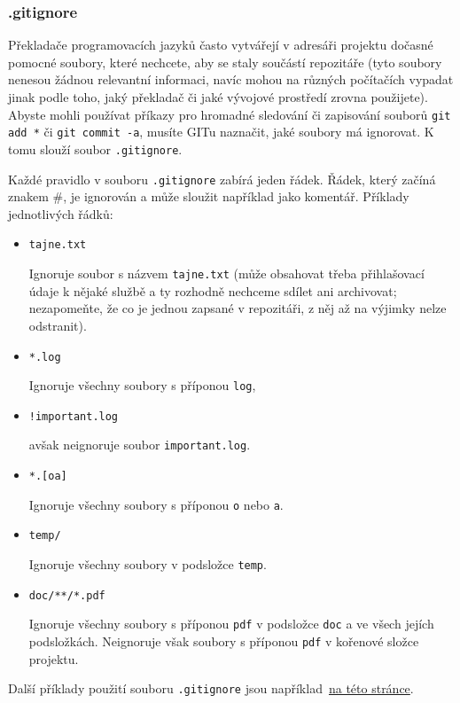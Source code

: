 \documentclass[a4paper,11pt,twoside]{article}
\def\code#1{\textnormal{\texttt{#1}}}
\theoremstyle{red}
\theoremstyle{green}
\begin{document}
\subsubsection{.gitignore}
\label{sec:gitignore}
    Překladače programovacích jazyků často vytvářejí v adresáři projektu dočasné pomocné soubory, které nechcete, aby se staly součástí repozitáře (tyto soubory nenesou žádnou relevantní informaci, navíc mohou na různých počítačích vypadat jinak podle toho, jaký překladač či jaké vývojové prostředí zrovna použijete).
    Abyste mohli používat příkazy pro hromadné sledování či zapisování souborů \code{git add *} či \code{git commit -a}, musíte GITu naznačit, jaké soubory má ignorovat.
    K tomu slouží soubor \code{.gitignore}.
    
    Každé pravidlo v souboru \code{.gitignore} zabírá jeden řádek.
    Řádek, který začíná znakem \#, je ignorován a může sloužit například jako komentář.
    Příklady jednotlivých řádků:
    \begin{itemize}
    \item \code{tajne.txt}
        
        Ignoruje soubor s názvem \code{tajne.txt} (může obsahovat třeba přihlašovací údaje k nějaké službě a ty rozhodně nechceme sdílet ani archivovat; nezapomeňte, že co je jednou zapsané v repozitáři, z něj až na výjimky nelze odstranit).

    \item \code{*.log}
    
        Ignoruje všechny soubory s příponou \code{log},

    \item \code{!important.log}

        avšak neignoruje soubor \code{important.log}.

    \item \code{*.[oa]}

        Ignoruje všechny soubory s příponou \code{o} nebo \code{a}.

    \item \code{temp/}

        Ignoruje všechny soubory v podsložce \code{temp}.

    \item \code{doc/**/*.pdf}
    
        Ignoruje všechny soubory s příponou \code{pdf} v podsložce \code{doc} a ve všech jejích podsložkách.
        Neignoruje však soubory s příponou \code{pdf} v kořenové složce projektu.
    \end{itemize}
    Další příklady použití souboru \code{.gitignore} jsou například~\href{https://www.atlassian.com/git/tutorials/saving-changes/gitignore}{na této stránce}.
\end{document}
